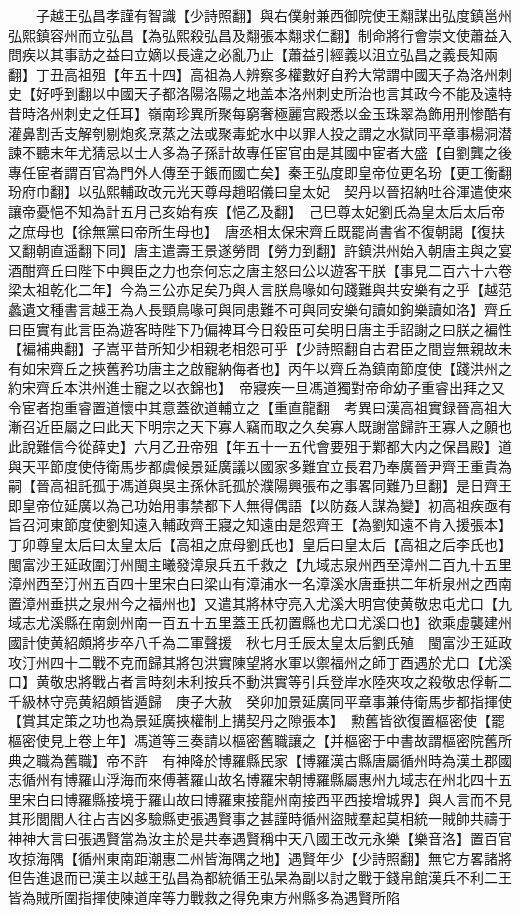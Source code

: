 　　子越王弘昌孝謹有智識【少詩照翻】與右僕射兼西御院使王翷謀出弘度鎮邕州弘熙鎮容州而立弘昌【為弘熙殺弘昌及翷張本翷求仁翻】制命將行會崇文使蕭益入問疾以其事訪之益曰立嫡以長違之必亂乃止【蕭益引經義以沮立弘昌之義長知兩翻】丁丑高祖殂【年五十四】高祖為人辨察多權數好自矜大常謂中國天子為洛州刺史【好呼到翻以中國天子都洛陽洛陽之地盖本洛州刺史所治也言其政今不能及遠特昔時洛州刺史之任耳】嶺南珍異所聚每窮奢極麗宫殿悉以金玉珠翠為飾用刑惨酷有灌鼻割舌支解刳剔炮炙烹蒸之法或聚毒蛇水中以罪人投之謂之水獄同平章事楊洞潜諫不聽末年尤猜忌以士人多為子孫計故專任宦官由是其國中宦者大盛【自劉龔之後專任宦者謂百官為門外人傳至于鋹而國亡矣】秦王弘度即皇帝位更名玢【更工衡翻玢府巾翻】以弘熙輔政改元光天尊母趙昭儀曰皇太妃　契丹以晉招納吐谷渾遣使來讓帝憂悒不知為計五月己亥始有疾【悒乙及翻】　己巳尊太妃劉氏為皇太后太后帝之庶母也【徐無黨曰帝所生母也】　唐丞相太保宋齊丘既罷尚書省不復朝謁【復扶又翻朝直遥翻下同】唐主遣壽王景遂勞問【勞力到翻】許鎮洪州始入朝唐主與之宴酒酣齊丘曰陛下中興臣之力也奈何忘之唐主怒曰公以遊客干朕【事見二百六十六卷梁太祖乾化二年】今為三公亦足矣乃與人言朕鳥喙如句踐難與共安樂有之乎【越范蠡遺文種書言越王為人長頸鳥喙可與同患難不可與同安樂句讀如鉤樂讀如洛】齊丘曰臣實有此言臣為遊客時陛下乃偏裨耳今日殺臣可矣明日唐主手詔謝之曰朕之褊性【褊補典翻】子嵩平昔所知少相親老相怨可乎【少詩照翻自古君臣之間豈無親故未有如宋齊丘之挾舊矜功唐主之啟寵納侮者也】丙午以齊丘為鎮南節度使【踐洪州之約宋齊丘本洪州進士寵之以衣錦也】　帝寢疾一旦馮道獨對帝命幼子重睿出拜之又令宦者抱重睿置道懷中其意蓋欲道輔立之【重直龍翻　考異曰漢高祖實録晉高祖大漸召近臣屬之曰此天下明宗之天下寡人竊而取之久矣寡人既謝當歸許王寡人之願也此說難信今從薛史】六月乙丑帝殂【年五十一五代會要殂于鄴都大内之保昌殿】道與天平節度使侍衛馬步都虞候景延廣議以國家多難宜立長君乃奉廣晉尹齊王重貴為嗣【晉高祖託孤于馮道與吳主孫休託孤於濮陽興張布之事畧同難乃旦翻】是日齊王即皇帝位延廣以為己功始用事禁都下人無得偶語【以防姦人謀為變】初高祖疾亟有旨召河東節度使劉知遠入輔政齊王寢之知遠由是怨齊王【為劉知遠不肯入援張本】　丁卯尊皇太后曰太皇太后【高祖之庶母劉氏也】皇后曰皇太后【高祖之后李氏也】　閩富沙王延政圍汀州閩主曦發漳泉兵五千救之【九域志泉州西至漳州二百九十五里漳州西至汀州五百四十里宋白曰梁山有漳浦水一名漳溪水唐垂拱二年析泉州之西南置漳州垂拱之泉州今之福州也】又遣其將林守亮入尤溪大明宫使黄敬忠屯尤口【九域志尤溪縣在南劍州南一百五十五里蓋王氏初置縣也尤口尤溪口也】欲乘虛襲建州國計使黄紹頗將步卒八千為二軍聲援　秋七月壬辰太皇太后劉氏殖　閩富沙王延政攻汀州四十二戰不克而歸其將包洪實陳望將水軍以禦福州之師丁酉遇於尤口【尤溪口】黄敬忠將戰占者言時刻未利按兵不動洪實等引兵登岸水陸夾攻之殺敬忠俘斬二千級林守亮黄紹頗皆遁歸　庚子大赦　癸卯加景延廣同平章事兼侍衛馬步都指揮使【賞其定策之功也為景延廣挾權制上搆契丹之隙張本】　勲舊皆欲復置樞密使【罷樞密使見上卷上年】馮道等三奏請以樞密舊職讓之【并樞密于中書故謂樞密院舊所典之職為舊職】帝不許　有神降於博羅縣民家【博羅漢古縣唐屬循州時為漢土郡國志循州有博羅山浮海而來傅著羅山故名博羅宋朝博羅縣屬惠州九域志在州北四十五里宋白曰博羅縣接境于羅山故曰博羅東接龍州南接西平西接增城界】與人言而不見其形閭閻人往占吉凶多驗縣吏張遇賢事之甚謹時循州盜賊羣起莫相統一賊帥共禱于神神大言曰張遇賢當為汝主於是共奉遇賢稱中天八國王改元永樂【樂音洛】置百官攻掠海隅【循州東南距潮惠二州皆海隅之地】遇賢年少【少詩照翻】無它方畧諸將但告進退而已漢主以越王弘昌為都統循王弘杲為副以討之戰于錢帛館漢兵不利二王皆為賊所圍指揮使陳道庠等力戰救之得免東方州縣多為遇賢所陷